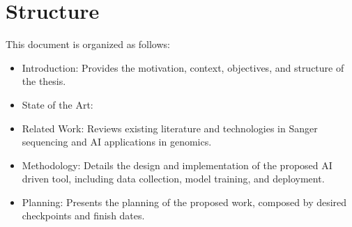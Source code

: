 \section{Structure}
\label{sec:Structure}

This document is organized as follows:

\begin{itemize}
  \item Introduction: Provides the motivation, context, objectives, and structure of the thesis.
  \item State of the Art: 
  \item Related Work: Reviews existing literature and technologies in Sanger sequencing and AI applications in genomics.
  \item Methodology: Details the design and implementation of the proposed AI driven tool, including data collection, model training, and deployment.
  \item Planning: Presents the planning of the proposed work, composed by desired checkpoints and finish dates.
  \end{itemize}
